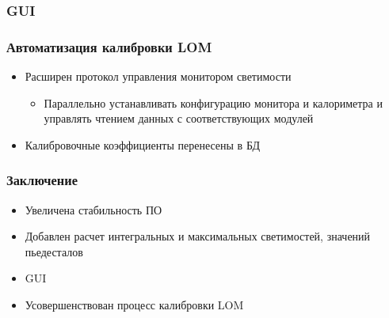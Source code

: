 \documentclass{beamer}
\begin{document}
\begin{frame}
\frametitle{GUI}

\end{frame}

\begin{frame}
\frametitle{Автоматизация калибровки LOM}
    \begin{itemize}
        \item Расширен протокол управления монитором светимости
            \begin{itemize}
                \item Параллельно устанавливать конфигурацию монитора и калориметра и управлять чтением данных с соответствующих модулей
            \end{itemize}
        \item Калибровочные коэффициенты перенесены в БД
    \end{itemize}
\end{frame}

\begin{frame}
\frametitle{Заключение}
    \begin{itemize}
        \item Увеличена стабильность ПО
        \item Добавлен расчет интегральных и максимальных светимостей, значений пьедесталов
        \item GUI
        \item Усовершенствован процесс калибровки LOM
    \end{itemize}
\end{frame}
\end{document}
